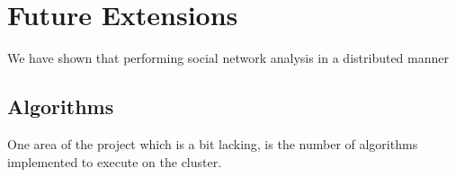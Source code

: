 \section{Future Extensions}
We have shown that performing social network analysis in a distributed manner

\subsection{Algorithms}
One area of the project which is a bit lacking, is the number of algorithms implemented to execute on the cluster. 


